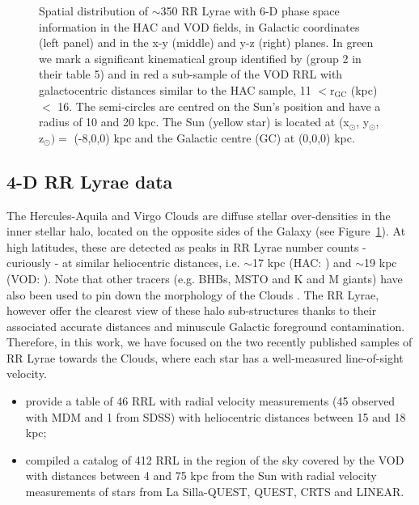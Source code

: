 \documentclass[fleqn,usenatbib]{mnras}
\begin{document}
\begin{figure}
	\vspace{-0.55cm}
    \caption{Spatial distribution of $\sim$350 RR Lyrae with 6-D phase space information in the HAC and VOD fields, in Galactic coordinates (left panel) and in the x-y (middle) and y-z (right) planes. In green we mark a significant kinematical group identified by \citet{Vivas2016} (group 2 in their table 5) and in red a sub-sample of the VOD RRL with galactocentric distances similar to the HAC sample, 11 $<\mathrm{r_{GC}}$ (kpc)$<$ 16. The semi-circles are centred on the Sun's position and have a radius of 10 and 20 kpc. The Sun (yellow star) is located at (x$_{\odot}$, y$_{\odot}$, z$_{\odot})= $ (-8,0,0) kpc and the Galactic centre (GC) at (0,0,0) kpc.  }
    \label{fig:lb}
\end{figure}
%
\subsection{4-D RR Lyrae data}
%
The Hercules-Aquila and Virgo Clouds are diffuse stellar
over-densities in the inner stellar halo, located on the opposite
sides of the Galaxy (see Figure~\ref{fig:lb}). At high latitudes,
these are detected as peaks in RR Lyrae number counts - curiously - at
similar heliocentric distances, i.e. $\sim$17 kpc (HAC:
\citealt{Wa09,Simion2014}) and $\sim$19 kpc (VOD: \citealt{Vivas2006,
  Duffau2014, Vivas2016}). Note that other tracers (e.g. BHBs, MSTO
and K and M giants) have also been used to pin down the morphology of
the Clouds \citep[see
  e.g.][]{Be07,Juric2008,Sharma2010,Bonaca2012,Conroy2018}. The RR
Lyrae, however offer the clearest view of these halo sub-structures
thanks to their associated accurate distances and minuscule Galactic
foreground contamination. Therefore, in this work, we have focused on
the two recently published samples of RR Lyrae towards the Clouds,
where each star has a well-measured line-of-sight velocity.
%
\begin{itemize}
\item \citet{Simion2018} provide a table of 46 RRL with radial
  velocity measurements (45 observed with MDM and 1 from SDSS) with
  heliocentric distances between 15 and 18 kpc;
\item \cite{Vivas2016} compiled a catalog of 412 RRL in the region of
  the sky covered by the VOD with distances between 4 and 75 kpc from
  the Sun with radial velocity measurements of stars from La
  Silla-QUEST, QUEST, CRTS and LINEAR.
\end{itemize}
%
%
\end{document}
